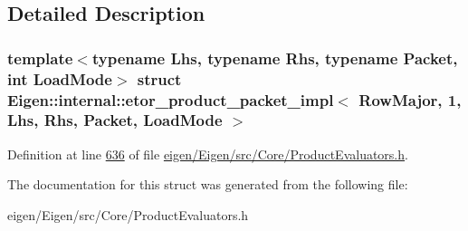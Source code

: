 \subsection{Detailed Description}
\subsubsection*{template$<$typename Lhs, typename Rhs, typename Packet, int Load\+Mode$>$\newline
struct Eigen\+::internal\+::etor\+\_\+product\+\_\+packet\+\_\+impl$<$ Row\+Major, 1, Lhs, Rhs, Packet, Load\+Mode $>$}



Definition at line \hyperlink{eigen_2_eigen_2src_2_core_2_product_evaluators_8h_source_l00636}{636} of file \hyperlink{eigen_2_eigen_2src_2_core_2_product_evaluators_8h_source}{eigen/\+Eigen/src/\+Core/\+Product\+Evaluators.\+h}.



The documentation for this struct was generated from the following file\+:\begin{DoxyCompactItemize}
\item 
eigen/\+Eigen/src/\+Core/\+Product\+Evaluators.\+h\end{DoxyCompactItemize}
